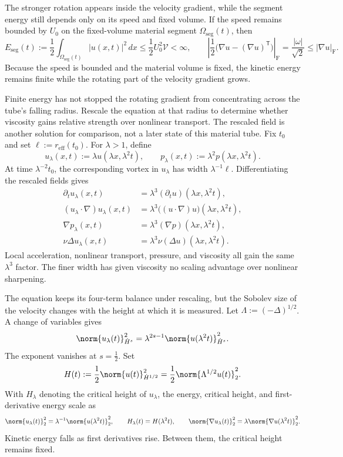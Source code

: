 The stronger rotation appears inside the velocity gradient, while the segment energy still depends only on its speed and fixed volume.
If the speed remains bounded by \(U_0\) on the fixed-volume material segment \(\Omega_{\mathrm{seg}}(t)\), then
\[
  E_{\mathrm{seg}}(t)
  :=
  \frac12\int_{\Omega_{\mathrm{seg}}(t)}|u(x,t)|^2\,dx
  \leq
  \frac12U_0^2\mathcal V
  <
  \infty,
  \qquad
  \left|\frac12\bigl(\nabla u-(\nabla u)^{\mathsf T}\bigr)\right|_{\mathrm F}
  =
  \frac{|\omega|}{\sqrt2}
  \leq
  |\nabla u|_{\mathrm F}.
\]
Because the speed is bounded and the material volume is fixed, the kinetic energy remains finite while the rotating part of the velocity gradient grows.


Finite energy has not stopped the rotating gradient from concentrating across the tube's falling radius.
Rescale the equation at that radius to determine whether viscosity gains relative strength over nonlinear transport.
The rescaled field is another solution for comparison, not a later state of this material tube.
Fix \(t_0\) and set \(\ell:=r_{\mathrm{eff}}(t_0)\).
For \(\lambda>1\), define
\[
  u_\lambda(x,t)
  :=
  \lambda u(\lambda x,\lambda^2t),
  \qquad
  p_\lambda(x,t)
  :=
  \lambda^2p(\lambda x,\lambda^2t).
\]
At time \(\lambda^{-2}t_0\), the corresponding vortex in \(u_\lambda\) has width \(\lambda^{-1}\ell\).
Differentiating the rescaled fields gives
\[
\begin{aligned}
  \partial_tu_\lambda(x,t)
  &=
  \lambda^3(\partial_tu)(\lambda x,\lambda^2t),
  \\
  (u_\lambda\cdot\nabla)u_\lambda(x,t)
  &=
  \lambda^3\bigl((u\cdot\nabla)u\bigr)(\lambda x,\lambda^2t),
  \\
  \nabla p_\lambda(x,t)
  &=
  \lambda^3(\nabla p)(\lambda x,\lambda^2t),
  \\
  \nu\Delta u_\lambda(x,t)
  &=
  \lambda^3\nu(\Delta u)(\lambda x,\lambda^2t).
\end{aligned}
\]
Local acceleration, nonlinear transport, pressure, and viscosity all gain the same \(\lambda^3\) factor.
The finer width has given viscosity no scaling advantage over nonlinear sharpening.


The equation keeps its four-term balance under rescaling, but the Sobolev size of the velocity changes with the height at which it is measured.
Let \(\Lambda:=(-\Delta)^{1/2}\).
A change of variables gives
\[
  \norm{u_\lambda(t)}_{\dot H^s}^2
  =
  \lambda^{2s-1}
  \norm{u(\lambda^2t)}_{\dot H^s}^2.
\]
The exponent vanishes at \(s=\tfrac12\).
Set
\[
  H(t)
  :=
  \frac12\norm{u(t)}_{\dot H^{1/2}}^2
  =
  \frac12\norm{\Lambda^{1/2}u(t)}_2^2.
\]
With \(H_\lambda\) denoting the critical height of \(u_\lambda\), the energy, critical height, and first-derivative energy scale as
\[
  \norm{u_\lambda(t)}_2^2
  =
  \lambda^{-1}\norm{u(\lambda^2t)}_2^2,
  \qquad
  H_\lambda(t)=H(\lambda^2t),
  \qquad
  \norm{\nabla u_\lambda(t)}_2^2
  =
  \lambda\norm{\nabla u(\lambda^2t)}_2^2.
\]
Kinetic energy falls as first derivatives rise.
Between them, the critical height remains fixed.


